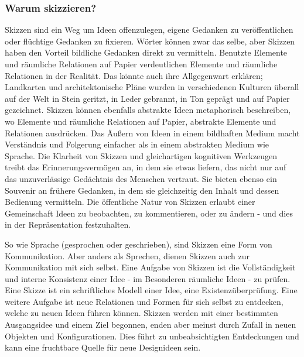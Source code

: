 \subsubsection{Warum skizzieren?} 
Skizzen sind ein Weg um Ideen offenzulegen, eigene Gedanken zu veröffentlichen oder flüchtige Gedanken zu fixieren. Wörter können zwar das selbe, aber Skizzen haben den Vorteil bildliche Gedanken direkt zu vermitteln. Benutzte Elemente und räumliche Relationen auf Papier verdeutlichen Elemente und räumliche Relationen in der Realität. Das könnte auch ihre Allgegenwart erklären; Landkarten und architektonische Pläne wurden in verschiedenen Kulturen überall auf der Welt in Stein geritzt, in Leder gebrannt, in Ton geprägt und auf Papier gezeichnet. Skizzen können ebenfalls abstrakte Ideen metaphorisch beschreiben, wo Elemente und räumliche Relationen auf Papier, abstrakte Elemente und Relationen ausdrücken. Das Äußern von Ideen in einem bildhaften Medium macht Verständnis und Folgerung einfacher als in einem abstrakten Medium wie Sprache. Die Klarheit von Skizzen und gleichartigen kognitiven Werkzeugen treibt das Erinnerungsvermögen an, in dem sie etwas liefern, das nicht nur auf das unzuverlässige Gedächtnis des Menschen vertraut. Sie bieten ebenso ein Souvenir an frühere Gedanken, in dem sie gleichzeitig den Inhalt und dessen Bedienung vermitteln. Die öffentliche Natur von Skizzen erlaubt einer Gemeinschaft Ideen zu beobachten, zu kommentieren, oder zu ändern - und dies in der Repräsentation festzuhalten.

\medskip So wie Sprache (gesprochen oder geschrieben), sind Skizzen eine Form von Kommunikation. Aber anders als Sprechen, dienen Skizzen auch zur Kommunikation mit sich selbst. Eine Aufgabe von Skizzen ist die Vollständigkeit und interne Konsistenz einer Idee - im Besonderen räumliche Ideen - zu prüfen. Eine Skizze ist ein schriftliches Modell einer Idee, eine Existenzüberprüfung. Eine weitere Aufgabe ist neue Relationen und Formen für sich selbst zu entdecken, welche zu neuen Ideen führen können. Skizzen werden mit einer bestimmten Ausgangsidee und einem Ziel begonnen, enden aber meinst durch Zufall in neuen Objekten und Konfigurationen. Dies führt zu unbeabsichtigten Entdeckungen und kann eine fruchtbare Quelle für neue Designideen sein. \citep{Tversky:2002}

